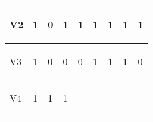 \documentclass{article}
\begin{document}
\begin{center}
\begin{table}[!h]
\begin{tabular}{|p{}|p{}|p{}|p{}|p{}|p{}|p{}|p{}|p{}|}
 \begin{center}
V2
\end{center}
 & \begin{center}
1
\end{center}
 & \begin{center}
0
\end{center}
 & \begin{center}
1
\end{center}
 & \begin{center}
1
\end{center}
 & \begin{center}
1
\end{center}
 & \begin{center}
1
\end{center}
 & \begin{center}
1
\end{center}
 & \begin{center}
1
\end{center}
 \\
\hline 
 \begin{center}
V3
\end{center}
 & \begin{center}
1
\end{center}
 & \begin{center}
0
\end{center}
 & \begin{center}
0
\end{center}
 & \begin{center}
0
\end{center}
 & \begin{center}
1
\end{center}
 & \begin{center}
1
\end{center}
 & \begin{center}
1
\end{center}
 & \begin{center}
0
\end{center}
 \\
\hline 
 \begin{center}
V4
\end{center}
 & \begin{center}
1
\end{center}
 & \begin{center}
1
\end{center}
 & \begin{center}
1
\end{center}
 & \begin{center}

\end{center}
\end{tabular}
\end{table}
\end{center}
\end{document}
